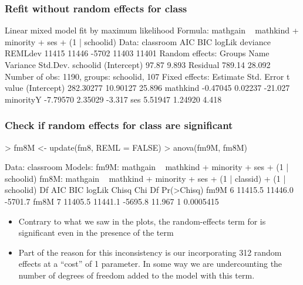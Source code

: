 \begin{frame}[fragile]
  \frametitle{Refit without random effects for class}
\begin{Schunk}
\begin{Soutput}
Linear mixed model fit by maximum likelihood 
Formula: mathgain ~ mathkind + minority + ses + (1 | schoolid) 
   Data: classroom 
   AIC   BIC logLik deviance REMLdev
 11415 11446  -5702    11403   11401
Random effects:
 Groups   Name        Variance Std.Dev.
 schoolid (Intercept)  97.87    9.893  
 Residual             789.14   28.092  
Number of obs: 1190, groups: schoolid, 107
Fixed effects:
             Estimate Std. Error t value
(Intercept) 282.30277   10.90127  25.896
mathkind     -0.47045    0.02237 -21.027
minorityY    -7.79570    2.35029  -3.317
ses           5.51947    1.24920   4.418
\end{Soutput}
\end{Schunk}
\end{frame}

\begin{frame}[fragile]
  \frametitle{Check if random effects for class are significant}
\begin{Schunk}
\begin{Sinput}
> fm8M <- update(fm8, REML = FALSE)
> anova(fm9M, fm8M)
\end{Sinput}
\begin{Soutput}
Data: classroom
Models:
fm9M: mathgain ~ mathkind + minority + ses + (1 | schoolid)
fm8M: mathgain ~ mathkind + minority + ses + (1 | classid) + (1 | schoolid)
     Df     AIC     BIC  logLik  Chisq Chi Df Pr(>Chisq)
fm9M  6 11415.5 11446.0 -5701.7                         
fm8M  7 11405.5 11441.1 -5695.8 11.967      1  0.0005415
\end{Soutput}
\end{Schunk}
\begin{itemize}
\item Contrary to what we saw in the plots, the random-effects term
  for  is significant even in the presence of the
   term
\item Part of the reason for this inconsistency is our incorporating
  312 random effects at a ``cost'' of 1 parameter.  In some way we are
  undercounting the number of degrees of freedom added to the model
  with this term.
\end{itemize}
\end{frame}


